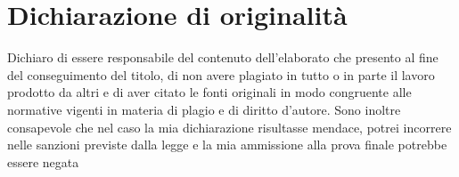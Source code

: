 
\chapter*{Dichiarazione di originalità}


Dichiaro di essere responsabile del contenuto dell'elaborato che presento al fine del conseguimento del titolo, di non avere plagiato in tutto o in parte il lavoro prodotto da altri e di aver citato le fonti originali in modo congruente alle normative vigenti in materia di plagio e di diritto d'autore. Sono inoltre consapevole che nel caso la mia dichiarazione risultasse mendace, potrei incorrere nelle sanzioni previste dalla legge e la mia ammissione alla prova finale potrebbe essere negata
\newpage